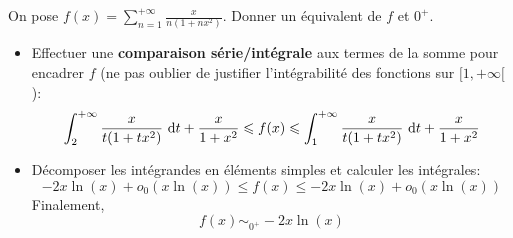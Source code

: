On pose $f(x) = \sum\limits_{n=1}^{+\infty}\frac{x}{n(1+nx^2)}$. Donner un équivalent de $f$ et $0^+$.\\
\begin{itemize}
    \item Effectuer une \textbf{comparaison série/intégrale} aux termes de la somme pour encadrer $f$ (ne pas oublier de justifier l'intégrabilité des fonctions sur $[1, +\infty[$):
    $$\int_{2}^{+\infty} \frac{x}{t(1+tx^2)}\ \mathrm{d} t + \frac{x}{1+x^2} \leqslant f(x) \leqslant \int_{1}^{+\infty} \frac{x}{t(1+tx^2)}\ \mathrm{d} t + \frac{x}{1+x^2}$$ 
    \item Décomposer les intégrandes en éléments simples et calculer les intégrales:
    $$-2x \ln(x) + o_0(x\ln(x)) \leqslant f(x) \leqslant -2x \ln(x) + o_0(x\ln(x))$$
    Finalement, 
    $$\boxed{f(x) \sim_{0^+} -2x\ln(x)}$$
\end{itemize}